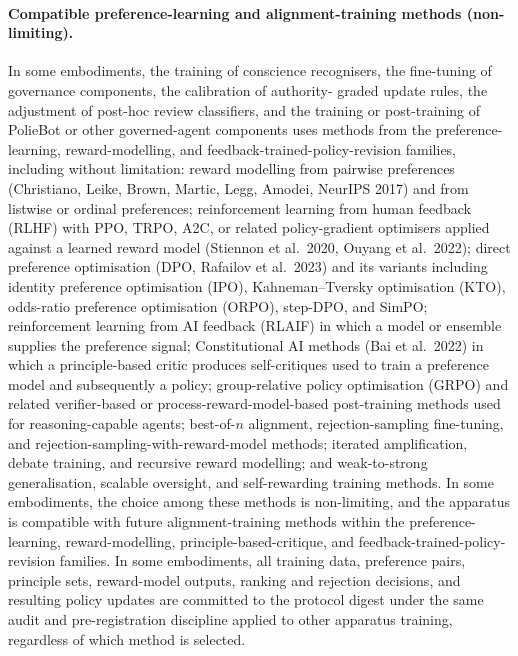 \documentclass[a4paper,12pt]{article}
\begin{document}
\paragraph{Compatible preference-learning and alignment-training
  methods (non-limiting).}
In some embodiments, the training of conscience recognisers, the
fine-tuning of governance components, the calibration of authority-
graded update rules, the adjustment of post-hoc review classifiers,
and the training or post-training of PolieBot or other governed-agent
components uses methods from the preference-learning,
reward-modelling, and feedback-trained-policy-revision families,
including without limitation: reward modelling from pairwise
preferences (Christiano, Leike, Brown, Martic, Legg, Amodei,
NeurIPS 2017) and from listwise or ordinal preferences; reinforcement
learning from human feedback (RLHF) with PPO, TRPO, A2C, or related
policy-gradient optimisers applied against a learned reward model
(Stiennon et al.\ 2020, Ouyang et al.\ 2022); direct preference
optimisation (DPO, Rafailov et al.\ 2023) and its variants including
identity preference optimisation (IPO), Kahneman--Tversky
optimisation (KTO), odds-ratio preference optimisation (ORPO),
step-DPO, and SimPO; reinforcement learning from AI feedback (RLAIF)
in which a model or ensemble supplies the preference signal;
Constitutional AI methods (Bai et al.\ 2022) in which a
principle-based critic produces self-critiques used to train a
preference model and subsequently a policy; group-relative policy
optimisation (GRPO) and related verifier-based or
process-reward-model-based post-training methods used for
reasoning-capable agents; best-of-$n$ alignment, rejection-sampling
fine-tuning, and rejection-sampling-with-reward-model methods;
iterated amplification, debate training, and recursive reward
modelling; and weak-to-strong generalisation, scalable oversight,
and self-rewarding training methods. In some embodiments, the
choice among these methods is non-limiting, and the apparatus is
compatible with future alignment-training methods within the
preference-learning, reward-modelling, principle-based-critique,
and feedback-trained-policy-revision families. In some embodiments,
all training data, preference pairs, principle sets, reward-model
outputs, ranking and rejection decisions, and resulting policy
updates are committed to the protocol digest under the same audit
and pre-registration discipline applied to other apparatus training,
regardless of which method is selected.

\end{document}
